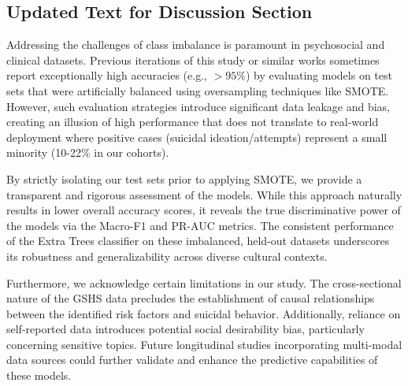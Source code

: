 \documentclass{article}
\begin{document}
\subsection*{Updated Text for Discussion Section}

Addressing the challenges of class imbalance is paramount in psychosocial and clinical datasets. Previous iterations of this study or similar works sometimes report exceptionally high accuracies (e.g., $>95\%$) by evaluating models on test sets that were artificially balanced using oversampling techniques like SMOTE. However, such evaluation strategies introduce significant data leakage and bias, creating an illusion of high performance that does not translate to real-world deployment where positive cases (suicidal ideation/attempts) represent a small minority (10-22\% in our cohorts). 

By strictly isolating our test sets prior to applying SMOTE, we provide a transparent and rigorous assessment of the models. While this approach naturally results in lower overall accuracy scores, it reveals the true discriminative power of the models via the Macro-F1 and PR-AUC metrics. The consistent performance of the Extra Trees classifier on these imbalanced, held-out datasets underscores its robustness and generalizability across diverse cultural contexts. 

Furthermore, we acknowledge certain limitations in our study. The cross-sectional nature of the GSHS data precludes the establishment of causal relationships between the identified risk factors and suicidal behavior. Additionally, reliance on self-reported data introduces potential social desirability bias, particularly concerning sensitive topics. Future longitudinal studies incorporating multi-modal data sources could further validate and enhance the predictive capabilities of these models.
\end{document}
